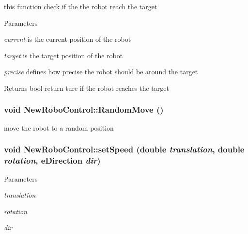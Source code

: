 this function check if the the robot reach the target 


\begin{DoxyParams}{Parameters}
\item[{\em current}]is the current position of the robot \item[{\em target}]is the target position of the robot \item[{\em precise}]defines how precise the robot should be around the target \end{DoxyParams}
\begin{DoxyReturn}{Returns}
bool return ture if the robot reaches the target 
\end{DoxyReturn}
\hypertarget{classNewRoboControl_ab3231acd7efd60677b4f48b094cb6dd3}{
\subsubsection[{RandomMove}]{\setlength{\rightskip}{0pt plus 5cm}void NewRoboControl::RandomMove ()}}
\label{classNewRoboControl_ab3231acd7efd60677b4f48b094cb6dd3}


move the robot to a random position 

\hypertarget{classNewRoboControl_ad2ddddb5f0272a733021524ebaaaeffd}{
\subsubsection[{setSpeed}]{\setlength{\rightskip}{0pt plus 5cm}void NewRoboControl::setSpeed (double {\em translation}, \/  double {\em rotation}, \/  {\bf eDirection} {\em dir})}}
\label{classNewRoboControl_ad2ddddb5f0272a733021524ebaaaeffd}

\begin{DoxyParams}{Parameters}
\item[{\em translation}]\item[{\em rotation}]\item[{\em dir}]\end{DoxyParams}


